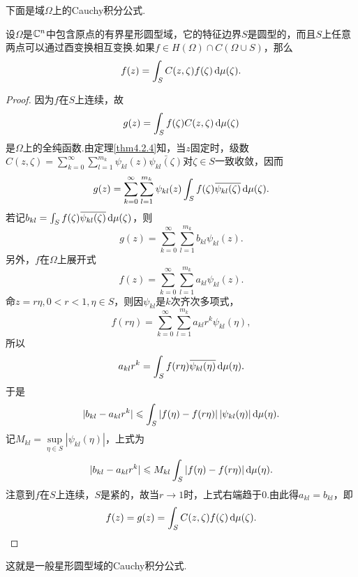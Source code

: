 下面是域$\Omega$上的Cauchy积分公式.
\begin{theorem}\label{thm4.3.2}
	设$\Omega$是$\mathbb C^n$中包含原点的有界星形圆型域，它的特征边界$S$是圆型的，而且$S$上任意两点可以通过酉变换相互变换.如果$f\in H(\Omega)\cap C(\Omega\cup S)$，那么
	\[f(z)=\int_S C(z,\zeta)f(\zeta)\mathop{}\!\mathrm{d}\mu(\zeta).\]
\end{theorem}
\begin{proof}
	因为$f$在$S$上连续，故
	\[g(z)=\int_S f(\zeta)C(z,\zeta)\mathop{}\!\mathrm{d}\mu(\zeta)\]
	是$\Omega$上的全纯函数.由定理\ref{thm4.2.4}知，当$z$固定时，级数$C(z,\zeta)=\sum\limits_{k=0}^\infty \sum\limits_{l=1}^{m_k}\psi_{kl}(z)\bar{\psi_{kl}(\zeta)}$对$\zeta\in S$一致收敛，因而
	\[g(z)=\sum\limits_{k=0}^\infty \sum\limits_{l=1}^{m_k}\psi_{kl}(z)\int_S f(\zeta){}\mkern1mu\overline{\mkern-1mu\psi_{kl}(\zeta)}\mathop{}\!\mathrm{d}\mu(\zeta).\]
	若记$b_{kl}=\int_S f(\zeta){}\mkern1mu\overline{\mkern-1mu\psi_{kl}(\zeta)}\mathop{}\!\mathrm{d}\mu(\zeta)$，则
	\[g(z)=\sum\limits_{k=0}^\infty \sum\limits_{l=1}^{m_k}b_{kl}\psi_{kl}(z).\]
	另外，$f$在$\Omega$上展开式
	\[f(z)=\sum\limits_{k=0}^\infty \sum\limits_{l=1}^{m_k}a_{kl}\psi_{kl}(z).\]
	命$z=r\eta,0<r<1,\eta\in S$，则因$\psi_{kl}$是$k$次齐次多项式，
	\[f(r\eta)=\sum\limits_{k=0}^\infty \sum\limits_{l=1}^{m_k} a_{kl}r^k\psi_{kl}(\eta),\]
	所以
	\[a_{kl}r^k=\int_S f(r\eta){}\mkern1mu\overline{\mkern-1mu\psi_{kl}(\eta)}\mathop{}\!\mathrm{d}\mu(\eta).\]
	于是
	\[|b_{kl}-a_{kl}r^k|\leqslant\int_S |f(\eta)-f(r\eta)|\,|\psi_{kl}(\eta)|\mathop{}\!\mathrm{d}\mu(\eta).\]
	记$M_{kl}=\sup\limits_{\eta\in S}|\psi_{kl}(\eta)|$，上式为
	\[|b_{kl}-a_{kl}r^k|\leqslant M_{kl}\int_S |f(\eta)-f(r\eta)|\mathop{}\!\mathrm{d}\mu(\eta).\]
	注意到$f$在$S$上连续，$S$是紧的，故当$r\to1$时，上式右端趋于$0$.由此得$a_{kl}=b_{kl}$，即
	\[f(z)=g(z)=\int_S C(z,\zeta)f(\zeta)\mathop{}\!\mathrm{d}\mu(\zeta).\qedhere\]
\end{proof}
这就是一般星形圆型域的Cauchy积分公式.
